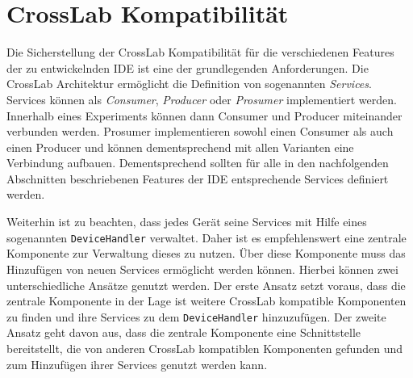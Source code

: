 \section{CrossLab Kompatibilität}\label{konzeption:crosslab-kompatibilität}

Die Sicherstellung der CrossLab Kompatibilität für die verschiedenen Features der zu entwickelnden IDE ist eine der grundlegenden Anforderungen. Die CrossLab Architektur ermöglicht die Definition von sogenannten \emph{Services}. Services können als \emph{Consumer}, \emph{Producer} oder \emph{Prosumer} implementiert werden. Innerhalb eines Experiments können dann Consumer und Producer miteinander verbunden werden. Prosumer implementieren sowohl einen Consumer als auch einen Producer und können dementsprechend mit allen Varianten eine Verbindung aufbauen. Dementsprechend sollten für alle in den nachfolgenden Abschnitten beschriebenen Features der IDE entsprechende Services definiert werden.

Weiterhin ist zu beachten, dass jedes Gerät seine Services mit Hilfe eines sogenannten \texttt{DeviceHandler} verwaltet. Daher ist es empfehlenswert eine zentrale Komponente zur Verwaltung dieses zu nutzen. Über diese Komponente muss das Hinzufügen von neuen Services ermöglicht werden können. Hierbei können zwei unterschiedliche Ansätze genutzt werden. Der erste Ansatz setzt voraus, dass die zentrale Komponente in der Lage ist weitere CrossLab kompatible Komponenten zu finden und ihre Services zu dem \texttt{DeviceHandler} hinzuzufügen. Der zweite Ansatz geht davon aus, dass die zentrale Komponente eine Schnittstelle bereitstellt, die von anderen CrossLab kompatiblen Komponenten gefunden und zum Hinzufügen ihrer Services genutzt werden kann.